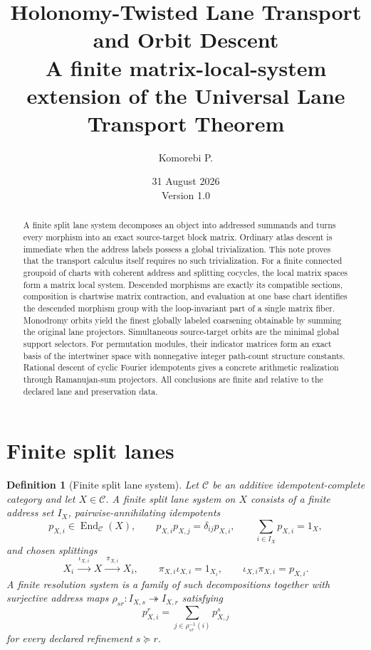 \documentclass[11pt]{article}
\title{\textbf{Holonomy-Twisted Lane Transport and Orbit Descent}\\[0.35em]
\large A finite matrix-local-system extension of the Universal Lane Transport Theorem}
\author{Komorebi P.}
\date{31 August 2026\\Version 1.0}
\newtheorem{definition}[theorem]{Definition}
\newcommand{\End}{\operatorname{End}}
\begin{document}
\maketitle

\begin{abstract}
A finite split lane system decomposes an object into addressed summands and turns every morphism into an exact source-target block matrix.  Ordinary atlas descent is immediate when the address labels possess a global trivialization.  This note proves that the transport calculus itself requires no such trivialization.  For a finite connected groupoid of charts with coherent address and splitting cocycles, the local matrix spaces form a matrix local system.  Descended morphisms are exactly its compatible sections, composition is chartwise matrix contraction, and evaluation at one base chart identifies the descended morphism group with the loop-invariant part of a single matrix fiber.  Monodromy orbits yield the finest globally labeled coarsening obtainable by summing the original lane projectors.  Simultaneous source-target orbits are the minimal global support selectors.  For permutation modules, their indicator matrices form an exact basis of the intertwiner space with nonnegative integer path-count structure constants.  Rational descent of cyclic Fourier idempotents gives a concrete arithmetic realization through Ramanujan-sum projectors.  All conclusions are finite and relative to the declared lane and preservation data.
\end{abstract}

\section{Finite split lanes}

\begin{definition}[Finite split lane system]
Let \(\mathcal C\) be an additive idempotent-complete category and let \(X\in\mathcal C\).  A finite split lane system on \(X\) consists of a finite address set \(I_X\), pairwise-annihilating idempotents
\[
 p_{X,i}\in\End_{\mathcal C}(X),\qquad
 p_{X,i}p_{X,j}=\delta_{ij}p_{X,i},\qquad
 \sum_{i\in I_X}p_{X,i}=1_X,
\]
and chosen splittings
\[
 X_i\xrightarrow{\ \iota_{X,i}\ }X
 \xrightarrow{\ \pi_{X,i}\ }X_i,
 \qquad
 \pi_{X,i}\iota_{X,i}=1_{X_i},
 \qquad
 \iota_{X,i}\pi_{X,i}=p_{X,i}.
\]
A finite resolution system is a family of such decompositions together with surjective address maps \(\rho_{sr}:I_{X,s}\twoheadrightarrow I_{X,r}\) satisfying
\[
 p^r_{X,i}=\sum_{j\in\rho_{sr}^{-1}(i)}p^s_{X,j}
\]
for every declared refinement \(s\succeq r\).
\end{definition}
\end{document}
